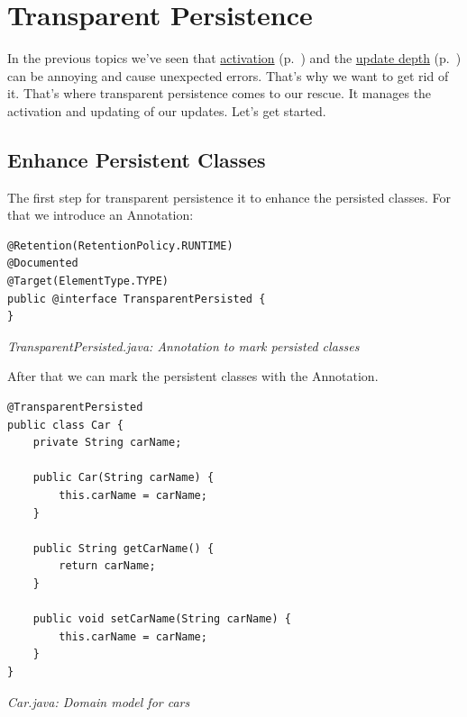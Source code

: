 
\chapter{Transparent Persistence}
\label{tut:transparentpersistence}

In the previous topics we've seen that \hyperref[tut:activation]{activation} (p.~\pageref{tut:activation}) and the \hyperref[tut:update-concept]{update depth} (p.~\pageref{tut:update-concept}) can be annoying and cause unexpected errors. That's why we want to get rid of it. That's where transparent persistence comes to our rescue. It manages the activation and updating of our updates. Let's get started.

\section{Enhance Persistent Classes}
\label{tut:transparentpersistence:enhance}

The first step for transparent persistence it to enhance the persisted classes. For that we introduce an Annotation:

\begin{lstlisting}
@Retention(RetentionPolicy.RUNTIME)
@Documented
@Target(ElementType.TYPE)
public @interface TransparentPersisted {
}
\end{lstlisting}

{\small\itshape TransparentPersisted.java: Annotation to mark persisted classes\par}
\medskip

After that we can mark the persistent classes with the Annotation.

\begin{lstlisting}
@TransparentPersisted
public class Car {
    private String carName;

    public Car(String carName) {
        this.carName = carName;
    }

    public String getCarName() {
        return carName;
    }

    public void setCarName(String carName) {
        this.carName = carName;
    }
}
\end{lstlisting}

{\small\itshape Car.java: Domain model for cars\par}
\medskip

